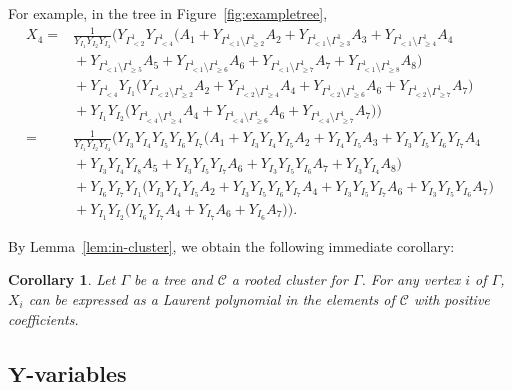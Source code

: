 \documentclass[pdftex]{sigma}
\numberwithin{equation}{section}
\newtheorem{Corollary}[Theorem]{Corollary}
\begin{document}
For example, in the tree in Figure~\ref{fig:exampletree},
\begin{align*}
X_4={} & \frac{1}{Y_{I_1}Y_{I_2}Y_{I_4}}\big( Y_{\Gamma_{< 2}^1}Y_{\Gamma_{< 4}^1}\big(A_1+Y_{\Gamma_{< 1}^1\setminus\Gamma_{\geq 2}^1}A_2+Y_{\Gamma_{< 1}^1\setminus\Gamma_{\geq 3}^1}A_3+Y_{\Gamma_{< 1}^1\setminus\Gamma_{\geq 4}^1}A_4 \\
&{}+Y_{\Gamma_{< 1}^1\setminus\Gamma_{\geq 5}^1}A_5+Y_{\Gamma_{< 1}^1\setminus\Gamma_{\geq 6}^1}A_6+Y_{\Gamma_{< 1}^1\setminus\Gamma_{\geq 7}^1}A_7+Y_{\Gamma_{< 1}^1\setminus\Gamma_{\geq 8}^1}A_8\big) \\
&{}+ Y_{\Gamma_{< 4}^1}Y_{I_1}\big(Y_{\Gamma_{< 2}^1\setminus\Gamma_{\geq 2}^1}A_2+Y_{\Gamma_{< 2}^1\setminus\Gamma_{\geq 4}^1}A_4+Y_{\Gamma_{< 2}^1\setminus\Gamma_{\geq 6}^1}A_6+Y_{\Gamma_{< 2}^1\setminus\Gamma_{\geq 7}^1}A_7\big) \\
&{}+ Y_{I_1}Y_{I_2}\big(Y_{\Gamma_{< 4}^1\setminus\Gamma_{\geq 4}^1}A_4+Y_{\Gamma_{< 4}^1\setminus\Gamma_{\geq 6}^1}A_6+Y_{\Gamma_{< 4}^1\setminus\Gamma_{\geq 7}^1}A_7\big)\big)\\
={} & \frac{1}{Y_{I_1}Y_{I_2}Y_{I_4}}\big( Y_{I_3}Y_{I_4}Y_{I_5}Y_{I_6}Y_{I_7}\big(A_1+Y_{I_3}Y_{I_4}Y_{I_5}A_2+Y_{I_4}Y_{I_5}A_3+Y_{I_3}Y_{I_5}Y_{I_6}Y_{I_7}A_4 \\
&{}+ Y_{I_3}Y_{I_4}Y_{I_8}A_5+Y_{I_3}Y_{I_5}Y_{I_7}A_6+Y_{I_3}Y_{I_5}Y_{I_6}A_7+Y_{I_3}Y_{I_4}A_8\big)\\
&{} +Y_{I_6}Y_{I_7}Y_{I_1}\big(Y_{I_3}Y_{I_4}Y_{I_5}A_2 + Y_{I_3}Y_{I_5}Y_{I_6}Y_{I_7}A_4+Y_{I_3}Y_{I_5}Y_{I_7}A_6+Y_{I_3}Y_{I_5}Y_{I_6}A_7\big)\\
&{} +Y_{I_1}Y_{I_2}\big(Y_{I_6}Y_{I_7}A_4+Y_{I_7}A_6+Y_{I_6}A_7\big)\big).
\end{align*}

By Lemma~\ref{lem:in-cluster}, we obtain the following immediate corollary:

\begin{Corollary}\label{cor:X-pos}
Let $\Gamma$ be a tree and $\mathcal{C}$ a rooted cluster for $\Gamma$. For any vertex $i$ of $\Gamma$, $X_{i}$ can be expressed as a Laurent polynomial in the elements of $\mathcal{C}$ with positive coefficients.
\end{Corollary}

\subsection[Y-variables]{$\boldsymbol{Y}$-variables}\label{sec:Y-formulas}
\end{document}
